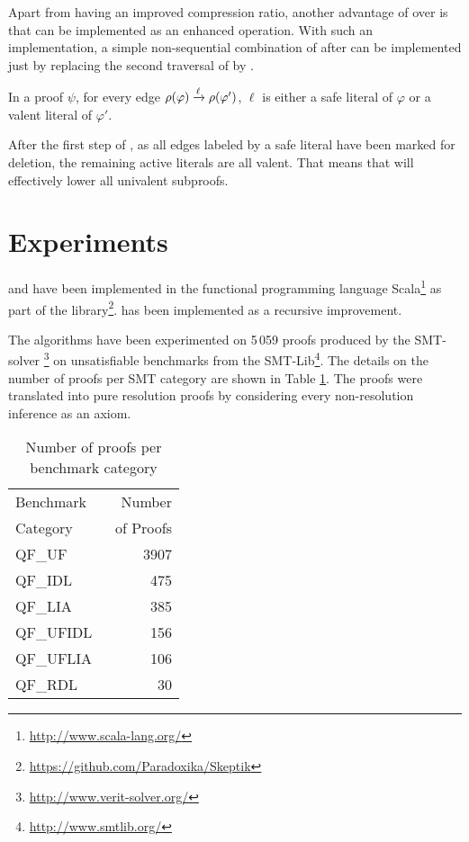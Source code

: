 \documentclass{llncs}
\begin{document}
Apart from having an improved compression ratio, another advantage of {\LowerUnivalents} over
{\LowerUnits} is that {\LowerUnivalents} can be implemented as an enhanced 
operation. With such an implementation, a simple non-sequential combination of {\LowerUnivalents}
after {\RPI} can be implemented just by replacing the second traversal of {\RPI} by
{\LowerUnivalents}.

\begin{proposition} \label{prop:LunivRPI}
In a proof $\psi$, for every edge $\rho(\varphi) \xrightarrow{\ell} \rho(\varphi')$, $\ell$ is either a safe literal
of $\varphi$ or a valent literal of $\varphi'$.
\end{proposition}

After the first step of {\RPI}, as all edges labeled by a safe literal have been marked for
deletion, the remaining active literals are all valent. That means that {\LowerUnivalents} will
effectively lower all univalent subproofs.



\section{Experiments} \label{sec:exp}

{\LowerUnivalents} and {\LUnivRPI} have been implemented in the functional programming
language Scala\footnote{\url{http://www.scala-lang.org/}} as part of the \skeptik
library\footnote{\url{https://github.com/Paradoxika/Skeptik}}. {\LowerUnivalents} has been implemented as a
recursive  improvement.

The algorithms have been experimented on 5\,059 proofs produced by the SMT-solver
{\veriT}\footnote{\url{http://www.verit-solver.org/}} on unsatisfiable benchmarks from the
SMT-Lib\footnote{\url{http://www.smtlib.org/}}.  The details on the number of proofs per SMT category
are shown in Table \ref{tab:benchmarks}.  The proofs were translated into pure resolution proofs by
considering every non-resolution inference as an axiom.

\begin{table}[tb]
  \caption{Number of proofs per benchmark category}
  \label{tab:benchmarks}
  \centering
  \begin{tabular}{lr}
    \toprule
    Benchmark~ &  Number \\
    Category       & ~of Proofs \\
    \midrule
    QF\_UF      & 3907 \\
    QF\_IDL     &  475 \\
    QF\_LIA     &  385 \\
    QF\_UFIDL   &  156 \\
    QF\_UFLIA   &  106 \\
    QF\_RDL     &   30 \\
    \bottomrule
  \end{tabular}
\end{table}
\end{document}
